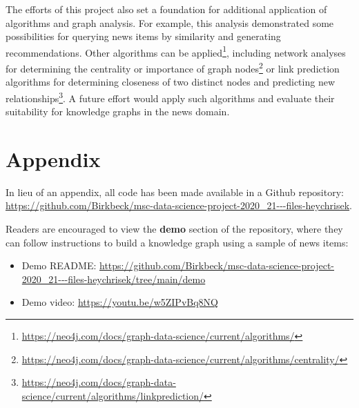 \documentclass[11pt]{article}
\begin{document}
The efforts of this project also set a foundation for additional application of algorithms and graph analysis. For example, this analysis demonstrated some possibilities for querying news items by similarity and generating recommendations. Other algorithms can be applied\footnote{\url{https://neo4j.com/docs/graph-data-science/current/algorithms/}}, including network analyses for determining the centrality or importance of graph nodes\footnote{\url{https://neo4j.com/docs/graph-data-science/current/algorithms/centrality/}} or link prediction algorithms for determining closeness of two distinct nodes and predicting new relationships\footnote{\url{https://neo4j.com/docs/graph-data-science/current/algorithms/linkprediction/}}. A future effort would apply such algorithms and evaluate their suitability for knowledge graphs in the news domain.

\newpage

\section{Appendix}

In lieu of an appendix, all code has been made available in a Github repository: \url{https://github.com/Birkbeck/msc-data-science-project-2020_21---files-heychrisek}.

Readers are encouraged to view the \textbf{demo} section of the repository, where they can follow instructions to build a knowledge graph using a sample of news items:
\begin{itemize}
  \item{Demo README: \url{https://github.com/Birkbeck/msc-data-science-project-2020_21---files-heychrisek/tree/main/demo}}
  \item{Demo video: \url{https://youtu.be/w5ZIPvBq8NQ}}
\end{itemize}

\newpage



\end{document}
